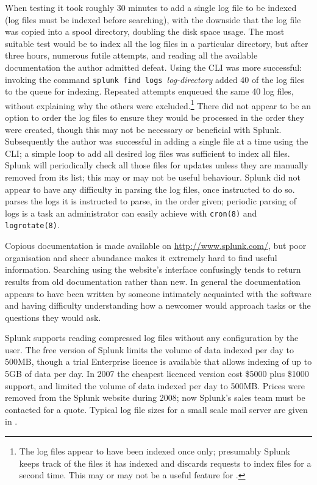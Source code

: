 When testing it took roughly 30 minutes to add a single log file to be
indexed (log files must be indexed before searching), with the downside
that the log file was copied into a spool directory, doubling the disk
space usage.  The most suitable test would be to index all the log files in
a particular directory, but after three hours, numerous futile attempts,
and reading all the available documentation the author admitted defeat.
Using the \gls{CLI} was more successful: invoking the command \newline{}
\tab{} \texttt{splunk find logs }\textit{log-directory\/}\newline{} added
40 of the \numberOFlogFILES{} log files to the queue for indexing.
Repeated attempts enqueued the same 40 log files, without explaining why
the others were excluded.\footnote{The log files appear to have been
indexed once only; presumably Splunk keeps track of the files it has
indexed and discards requests to index files for a second time.  This may
or may not be a useful feature for \parsername{}.} There did not appear to
be an option to order the log files to ensure they would be processed in
the order they were created, though this may not be necessary or beneficial
with Splunk.  Subsequently the author was successful in adding a single
file at a time using the \gls{CLI}; a simple loop to add all desired log
files was sufficient to index all files.  Splunk will periodically check
all those files for updates unless they are manually removed from its list;
this may or may not be useful behaviour.  Splunk did not appear to have any
difficulty in parsing the log files, once instructed to do so.
\parsername{} parses the logs it is instructed to parse, in the order
given; periodic parsing of logs is a task an administrator can easily
achieve with \texttt{cron(8)} and \texttt{logrotate(8)}.

Copious documentation is made available on \url{http://www.splunk.com/},
but poor organisation and sheer abundance makes it extremely hard to find
useful information.  Searching using the website's interface confusingly
tends to return results from old documentation rather than new.  In
general the documentation appears to have been written by someone
intimately acquainted with the software and having difficulty understanding
how a newcomer would approach tasks or the questions they would ask.

Splunk supports reading compressed log files without any configuration by
the user.  The free version of Splunk limits the volume of data indexed per
day to 500MB, though a trial Enterprise licence is available that allows
indexing of up to 5GB of data per day.  In 2007 the cheapest licenced
version cost \$5000 plus \$1000 support, and limited the volume of data
indexed per day to 500MB\@.  Prices were removed from the Splunk website
during 2008; now Splunk's sales team must be contacted for a quote.
Typical log file sizes for a small scale mail server are given in
.


